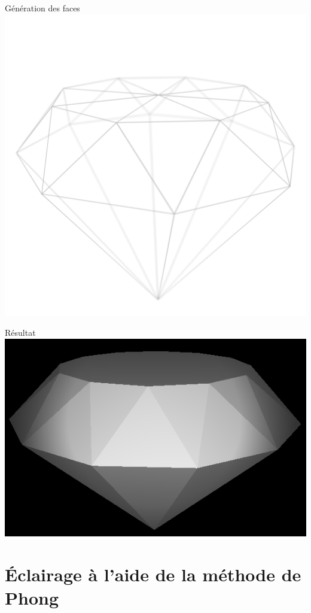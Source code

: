 \documentclass[11pt]{beamer}
\begin{document}
\begin{frame}{Génération des faces}
    {\centering \includegraphics[height=0.95\textheight]{Maillage/wireframe}}
\end{frame}

\begin{frame}{Résultat}
    {\centering \includegraphics[height=0.95\textheight]{Maillage/result}}
\end{frame}

\section{Éclairage à l'aide de la méthode de Phong}
\end{document}
